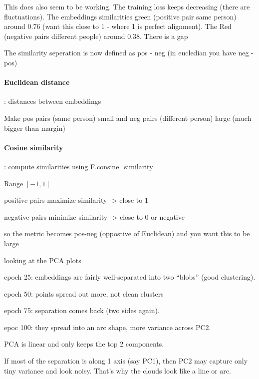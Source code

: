 This does also seem to be working. The training loss keeps decreasing (there are fluctuations). The embeddings similarities green (positive pair same person)
around 0.76 (want this close to 1 - where 1 is perfect alignment). The Red (negative pairs different people) around 0.38. There is a gap

The similarity seperation is now defined as pos - neg (in eucledian you have neg - pos)

\paragraph{Euclidean distance}: distances between embeddings

Make pos pairs (same person) small and neg pairs (different person) large (much bigger than margin)

\paragraph{Cosine similarity}: compute similarities using F.consine\_similarity

Range $[-1,1]$

positive pairs maximize similarity -> close to 1

negative pairs minimize similarity -> close to 0 or negative

so the metric becomes pos-neg (oppostive of Euclidean) and you want this to be large

looking at the PCA plots

\begin{compactitem}
  \item epoch 25: embeddings are fairly well-separated into two “blobs” (good clustering).
  \item epoch 50: points spread out more, not clean clusters
  \item epoch 75: separation comes back (two sides again).
  \item epoc 100: they spread into an arc shape, more variance across PC2.
\end{compactitem}

\begin{compactitem}
  \item PCA is linear and only keeps the top 2 components.
  \item If most of the separation is along 1 axis (say PC1), then PC2 may capture only tiny variance and look noisy. That's why the clouds look like a line or arc.
\end{compactitem}

